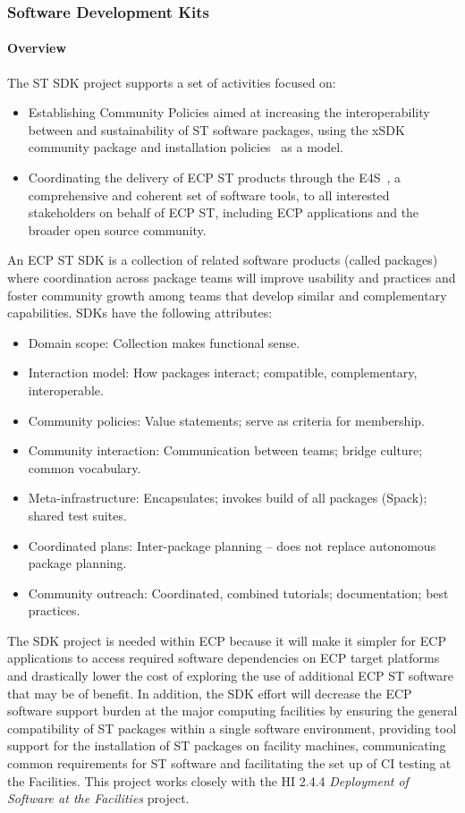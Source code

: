 \subsubsection{ Software Development Kits} \label{subsubsect:ecosystem-sdk}

\paragraph{Overview} The ST SDK project supports a set of activities focused on:
\begin{itemize}
\item Establishing Community Policies aimed at increasing the interoperability between and sustainability of ST software packages, using the xSDK~\cite{xsdk:homepage} community package and installation policies~\cite{xsdk-policies:homepage} as a model.
\item Coordinating the delivery of ECP ST products through the E4S~\cite{e4s:homepage}, a comprehensive and coherent set of software tools, to all interested stakeholders on behalf of ECP ST, including ECP applications and the broader open source community.
\end{itemize}

An ECP ST SDK is a collection of related software products (called packages) where coordination across package teams will improve usability and practices and foster community growth among teams that develop similar and complementary capabilities.  SDKs have the following attributes:
\begin{itemize}
\item Domain scope: Collection makes functional sense.
\item Interaction model: How packages interact; compatible, complementary, interoperable.
\item Community policies: Value statements; serve as criteria for membership.
\item Community interaction: Communication between teams; bridge culture; common vocabulary.
\item Meta-infrastructure: Encapsulates; invokes build of all packages (Spack); shared test suites.
\item Coordinated plans: Inter-package planning -- does not replace autonomous package planning.
\item Community outreach: Coordinated, combined tutorials; documentation; best practices.
\end{itemize}

The SDK project is needed within ECP because it will make it simpler for ECP applications to access required software dependencies on ECP target platforms and drastically lower the cost of exploring the use of additional ECP ST software that may be of benefit. In addition, the SDK effort will decrease the ECP software support burden at the major computing facilities by ensuring the general compatibility of ST packages within a single software environment, providing tool support for the installation of ST packages on facility machines, communicating common requirements for ST software and facilitating the set up of CI testing at the Facilities. This project works closely with the HI 2.4.4 \textit{Deployment of Software at the Facilities} project.

